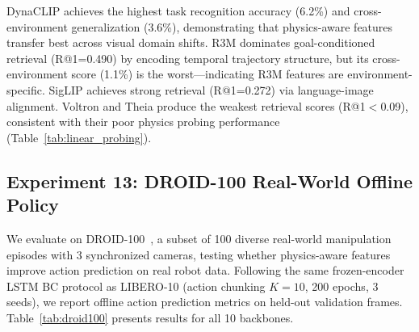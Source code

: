 \documentclass{article}
\begin{document}
DynaCLIP achieves the highest task recognition accuracy (6.2\%) and cross-environment generalization (3.6\%), demonstrating that physics-aware features transfer best across visual domain shifts. R3M dominates goal-conditioned retrieval (R@1{=}0.490) by encoding temporal trajectory structure, but its cross-environment score (1.1\%) is the worst---indicating R3M features are environment-specific. SigLIP achieves strong retrieval (R@1{=}0.272) via language-image alignment. Voltron and Theia produce the weakest retrieval scores (R@1{$<$}0.09), consistent with their poor physics probing performance (Table~\ref{tab:linear_probing}).



\subsection{Experiment 13: DROID-100 Real-World Offline Policy}
\label{sec:exp_droid}

We evaluate on DROID-100~\cite{khazatsky2024droid}, a subset of 100 diverse real-world manipulation episodes with 3 synchronized cameras, testing whether physics-aware features improve action prediction on real robot data. Following the same frozen-encoder LSTM BC protocol as LIBERO-10 (action chunking $K{=}10$, 200 epochs, 3 seeds), we report offline action prediction metrics on held-out validation frames. Table~\ref{tab:droid100} presents results for all 10 backbones.
\end{document}
